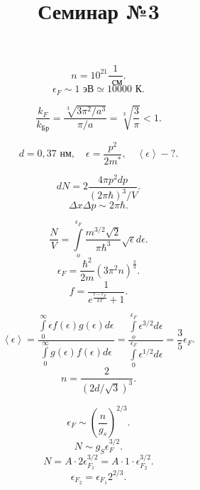 \documentclass[a4paper]{article}
\title{Семинар №3}
\begin{document}
	\maketitle
\begin{hiProb}[Задача 0-3-1]
\[
n=10^{21} \frac{1}{\text{ см}}
.\] 
\[
\epsilon_F\sim 1\text{ эВ} \simeq 10000 \text{ К}
.\] 
\begin{figure}[ht]
    \centering
    \caption{}
    \label{fig:1}
\end{figure}
\end{hiProb}
\begin{hiProb}[Задача 0-3-2]
\[
	\frac{k_F}{k_\text{Бр}}= \frac{\sqrt[3]{3\pi^2 /a^3} }{\pi /a}
	=\sqrt[3]{\frac{3}{\pi}} <1
.\] 
\end{hiProb}
\begin{hiProb}[Задача 3.4]
	\[
	d=0,37\text{ нм},\quad \epsilon=\frac{p^2}{2m^*},\quad
	\left< \epsilon \right>-?
	.\] 
\end{hiProb}
\begin{sol}
\[
	dN= 2\frac{4\pi p^2 dp}{(2\pi \hbar)^3 /V}
.\] 
\[
\Delta x\Delta p\sim 2\pi \hbar
.\] 
\begin{figure}[ht]
    \centering
    \caption{}
    \label{fig:2}
\end{figure}
\[
\frac{N}{V}= \int\limits_{o}^{\epsilon_F} \frac{m^{3 /2}\sqrt{2} }{\pi \hbar^3}\sqrt{\epsilon } d\epsilon 
.\] 
\[
	\epsilon_F= \frac{\hbar^2}{2m}(3\pi^2 n)^{\frac{2}{3}}
.\] 
\[
f=\frac{1}{e^{\frac{\epsilon-\epsilon_F}{kT}}+1}
.\] 
\begin{figure}[ht]
    \centering
    \caption{}
    \label{fig:3}
\end{figure}
\[
\left<\epsilon  \right>= \frac{\int\limits_{0}^{\infty} \epsilon
f(\epsilon) g(\epsilon)d\epsilon }{\int\limits_{0}^{\infty} g(\epsilon)f(\epsilon) d\epsilon }=
\frac{\int\limits_{o}^{\epsilon_F}\epsilon^{3 /2}  d\epsilon }{\int\limits_{0}^{\epsilon_F} \epsilon^{1 /2}d\epsilon }= \frac{3}{5}\epsilon_F
.\] 
\[
	n=\frac{2}{\left( 2d /\sqrt{3}  \right) ^3}
.\] 
\end{sol}
\begin{hiProb}[Задача 3.13]
\end{hiProb}
\begin{sol}
\[
	\epsilon_F\sim  \left( \frac{n}{g_s} \right) ^{2 /3}
.\] 
\[
N \sim  g_S \epsilon_F ^{ 3 /2}
.\] 
\[
N= A\cdot 2 \epsilon_{F_1}^{3 /2}=A \cdot 1\cdot \epsilon_{F_2}^{3 /2}
.\] 
\[
\epsilon_{F_2}=\epsilon_{F_1}2^{2 /3}
.\] 
\end{sol}
\end{document}
